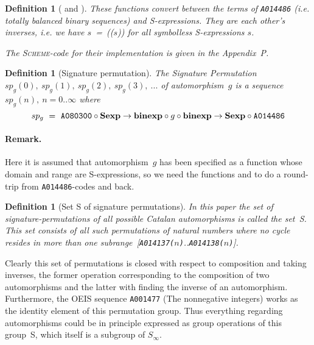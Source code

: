 \documentclass[11pt]{article} %
\newcommand{\autletter}[1]{$#1$}
\newcommand{\automorphismlet}[1]{automorphism~\autletter{#1}}
\newcommand{\EISseq}[1]{{\tt #1}}
\newcommand{\proglangname}[1]{{\textsc{#1}}}
\newcommand{\SET}[1]{{\textsc{#1}}}
\newtheorem{definition}[theorem]{Definition}
\newcommand{\funapply}{\ensuremath{\circ}}
\begin{document}
\newcommand{\Subrange} {subrange~[\EISseq{A014137}($n$-1)..\EISseq{A014138}($n$-1)]}

\begin{definition}[{{\binexpSexp} and {\Sexpbinexp}}]
\normalfont

These functions convert between the terms of \EISseq{A014486}
(i.e. totally balanced binary sequences) and S-expressions.
They are each other's inverses, i.e.
we have $s$~=~{\binexpSexp}({\Sexpbinexp}($s$)) for all symbolless S-expressions
$s$. %

The \proglangname{Scheme}-code for their implementation is given in the Appendix~P.


\end{definition}


\begin{definition}[{Signature permutation}]
\normalfont

The Signature Permutation $sp_{g}(0),~sp_{g}(1),~sp_{g}(2),~sp_{g}(3),~...$
of \automorphismlet{g} is a sequence
$sp_{g}(n),~n=0..\infty$
where
$$
sp_g~=~\EISseq{A080300} \funapply {\Sexpbinexp} \funapply g \funapply
{\binexpSexp} \funapply \EISseq{A014486}
$$

\end{definition}

\paragraph{Remark.}
Here it is assumed that \automorphismlet{g} has been specified
as a
function whose domain and range are S-expressions,
so we need the functions {\binexpSexp} and {\Sexpbinexp}
to do a round-trip from \EISseq{A014486}-codes and back.

\begin{definition}[{Set \SET{S} of signature permutations}]
\normalfont

In this paper the set of signature-permutations of all possible
Catalan automorphisms
is called the set~\SET{S}.
This set consists of all such permutations of natural numbers where no cycle
resides in more than one
subrange~[\EISseq{A014137($n$)}..\EISseq{A014138($n$)}].

\end{definition}


Clearly this set of permutations is closed with respect to composition
and taking inverses, the former operation corresponding
to the composition of two automorphisms and the latter
with finding the inverse of an automorphism.
Furthermore, the OEIS sequence \EISseq{A001477} (The nonnegative integers)
works as the identity element of this permutation group.
Thus everything regarding automorphisms could be in principle
expressed as group operations of this group~\SET{S}, which itself
is a subgroup of $S_\infty$.
\end{document}
